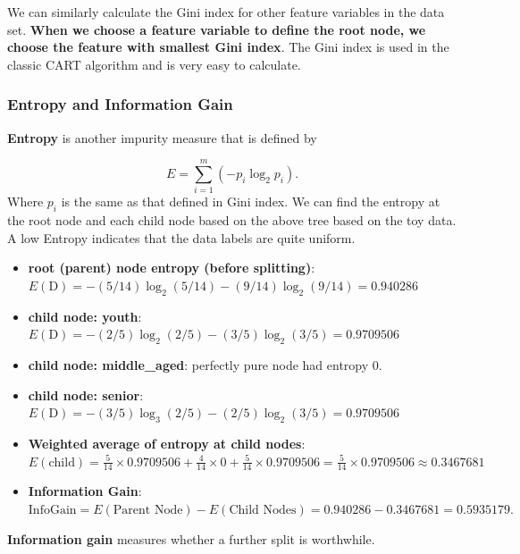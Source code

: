 \documentclass[
]{book}
\providecommand{\tightlist}{%
  \setlength{\itemsep}{0pt}\setlength{\parskip}{0pt}}
\begin{document}
We can similarly calculate the Gini index for other feature variables in the data set. \textbf{When we choose a feature variable to define the root node, we choose the feature with smallest Gini index}. The Gini index is used in the classic CART algorithm and is very easy to calculate.

\hypertarget{entropy-and-information-gain}{%
\subsubsection{Entropy and Information Gain}\label{entropy-and-information-gain}}

\textbf{Entropy} is another impurity measure that is defined by

\[
E = \sum_{i = 1}^m (-p_i \log_2p_i).
\]
Where \(p_i\) is the same as that defined in Gini index. We can find the entropy at the root node and each child node based on the above tree based on the toy data. A low Entropy indicates that the data labels are quite uniform.

\begin{itemize}
\item
  \textbf{root (parent) node entropy (before splitting)}: \(E(\mbox{D}) = -(5/14)\log_2(5/14) - (9/14)\log_2(9/14) = 0.940286\)
\item
  \textbf{child node: youth}: \(E(\mbox{D}) = -(2/5)\log_2(2/5) - (3/5)\log_2(3/5) = 0.9709506\)
\item
  \textbf{child node: middle\_aged}: perfectly pure node had entropy 0.
\item
  \textbf{child node: senior}: \(E(\mbox{D}) = -(3/5)\log_3(2/5) - (2/5)\log_2(3/5) = 0.9709506\)
\item
  \textbf{Weighted average of entropy at child nodes}: \(E(\mbox{child}) = \frac{5}{14}\times 0.9709506 + \frac{4}{14}\times 0 +\frac{5}{14}\times 0.9709506 = \frac{5}{14}\times 0.9709506 \approx 0.3467681\)
\end{itemize}

\hfill\break

\begin{itemize}
\tightlist
\item
  \textbf{Information Gain}: \(\mbox{InfoGain} = E(\mbox{Parent Node}) - E(\mbox{Child Nodes}) = 0.940286 - 0.3467681 = 0.5935179.\)
\end{itemize}

\hfill\break

\textbf{Information gain} measures whether a further split is worthwhile.
\end{document}
